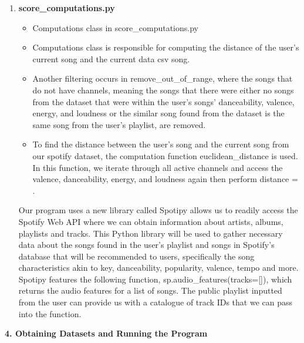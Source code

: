 \documentclass[fontsize=11pt]{article}
\begin{document}
\begin{enumerate}
\begin{enumerate}
        \item\textbf{score\_computations.py}
        \begin{itemize}\item Computations class in score\_computations.py
        \end{itemize}
        
        \begin{itemize}
         \item Computations class is responsible for computing the distance of the user’s current song and the current data csv song.
         \newline
         \newline
         \item Another filtering occurs in remove\_out\_of\_range, where the songs that do not have channels, meaning the songs that there were either no songs from the dataset that were within the user's songs' danceability, valence, energy, and loudness or the similar song found from the dataset is the same song from the user's playlist, are removed.
         

         \item To find the distance between the user’s song and the current song from our spotify dataset, the computation function euclidean\_distance is used. In this function, we iterate through all active channels and access the valence, danceability, energy, and loudness again then perform distance = \sqrt{[(x2 – x1)^2 + (y2 – y1)^2]}.
        \end{itemize}
        Our program uses a new library called Spotipy allows us to readily access the Spotify Web API where we can obtain information about artists, albums, playlists and tracks. This Python library will be used to gather necessary data about the songs found in the user's playlist and songs in Spotify’s database that will be recommended to users, specifically the song characteristics akin to key, danceability, popularity, valence, tempo and more. Spotipy features the following function, sp.audio\_features(tracks=[]), which returns the audio features for a list of songs. The public playlist inputted from the user can provide us with a catalogue of track IDs that we can pass into the function. \\
        
    \end{enumerate}

\textbf{4. Obtaining Datasets and Running the Program} \newline


\end{enumerate}
\end{document}
